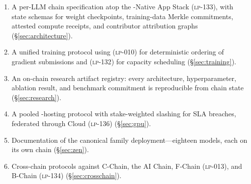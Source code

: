 \begin{enumerate}[leftmargin=*]
\item A per-LLM chain specification atop the \Quasar{}-Native App Stack (\textsc{lp-133}), with state schemas for weight checkpoints, training-data Merkle commitments, attested compute receipts, and contributor attribution graphs (\S\ref{sec:architecture}).
\item A unified training protocol using \BlockSTM{} (\textsc{lp-010}) for deterministic ordering of gradient submissions and \Quasar{}\GPU{} (\textsc{lp-132}) for capacity scheduling (\S\ref{sec:training}).
\item An on-chain research artifact registry: every architecture, hyperparameter, ablation result, and benchmark commitment is reproducible from chain state (\S\ref{sec:research}).
\item A pooled \GPU{}-hosting protocol with stake-weighted slashing for SLA breaches, federated through \Lux{} Cloud (\textsc{lp-136}) (\S\ref{sec:gpu}).
\item Documentation of the canonical \Zen{} family deployment---eighteen models, each on its own chain (\S\ref{sec:zen}).
\item Cross-chain protocols against \Lux{} C-Chain, the \Hanzo{} AI Chain, \Lux{} F-Chain (\textsc{lp-013}), and \Lux{} B-Chain (\textsc{lp-134}) (\S\ref{sec:crosschain}).
\end{enumerate}
